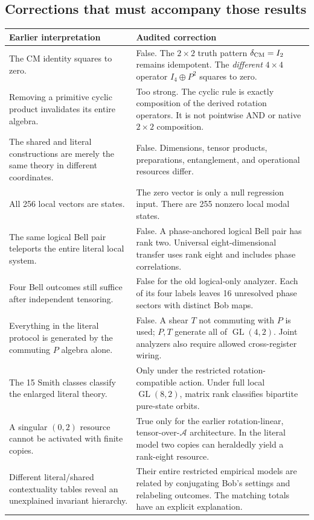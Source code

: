 \documentclass[11pt,a4paper]{article}
\theoremstyle{definition}\newtheorem{definition}[theorem]{Definition}
\newcommand{\A}{\mathcal A}
\newcommand{\GL}{\operatorname{GL}}
\begin{document}
\subsection{Corrections that must accompany those results}
\begin{longtable}{@{}L{43mm}L{111mm}@{}}
\toprule Earlier interpretation & Audited correction\\\midrule\endhead
The CM identity squares to zero. & False. The $2\times2$ truth pattern $\delta_{\rm CM}=I_2$ remains idempotent. The \emph{different} $4\times4$ operator $I_4\oplus P^2$ squares to zero.\\
Removing a primitive cyclic product invalidates its entire algebra. & Too strong. The cyclic rule is exactly composition of the derived rotation operators. It is not pointwise AND or native $2\times2$ composition.\\
The shared and literal constructions are merely the same theory in different coordinates. & False. Dimensions, tensor products, preparations, entanglement, and operational resources differ.\\
All 256 local vectors are states. & The zero vector is only a null regression input. There are 255 nonzero local modal states.\\
The same logical Bell pair teleports the entire literal local system. & False. A phase-anchored logical Bell pair has rank two. Universal eight-dimensional transfer uses rank eight and includes phase correlations.\\
Four Bell outcomes still suffice after independent tensoring. & False for the old logical-only analyzer. Each of its four labels leaves 16 unresolved phase sectors with distinct Bob maps.\\
Everything in the literal protocol is generated by the commuting $P$ algebra alone. & False. A shear $T$ not commuting with $P$ is used; $P,T$ generate all of $\GL(4,2)$. Joint analyzers also require allowed cross-register wiring.\\
The 15 Smith classes classify the enlarged literal theory. & Only under the restricted rotation-compatible action. Under full local $\GL(8,2)$, matrix rank classifies bipartite pure-state orbits.\\
A singular $(0,2)$ resource cannot be activated with finite copies. & True only for the earlier rotation-linear, tensor-over-$\A$ architecture. In the literal model two copies can heraldedly yield a rank-eight resource.\\
Different literal/shared contextuality tables reveal an unexplained invariant hierarchy. & Their entire restricted empirical models are related by conjugating Bob's settings and relabeling outcomes. The matching totals have an explicit explanation.\\

\end{longtable}
\end{document}
